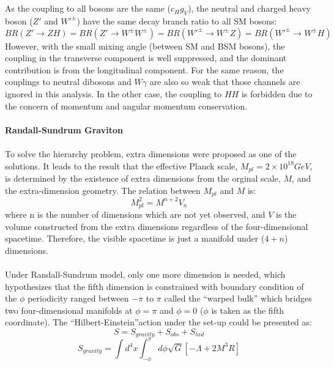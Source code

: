 \\
\\As the coupling to all bosons are the same ($c_{H}g_{V}$), the neutral and charged heavy boson ($Z'$ and $W'^{\pm}$) have the same decay branch ratio to all SM bosons:
\begin{equation}
BR(Z'\rightarrow ZH) = BR(Z'\rightarrow W^\pm W^\pm) = BR(W'^\pm \rightarrow W^\pm Z) = BR(W'^\pm \rightarrow W^\pm H)
\end{equation}
However, with the small mixing angle (between SM and BSM bosons), the coupling in the transverse component is well suppressed, and the dominant contribution is from the longitudinal component. For the same reason, the couplings to neutral dibosons and $W\gamma$ are also so weak that those channels are ignored in this analysis. In the other case, the coupling to $HH$ is forbidden due to the concern of momentum and angular momentum conservation. 
\\
\\{\bf Randall-Sundrum Graviton}
\\
\\To solve the hierarchy problem, extra dimensions were proposed as one of the solutions\cite{Randall:1999ee}. It leads to the result that the effective Planck scale, $M_{pl}=2\times10^{18}GeV$, is determined by the existence of extra dimensions from the orginal scale, $M$, and the extra-dimension geometry. The relation between $M_{pl}$ and $M$ is: 
\begin{equation}
\label{Eq:planck_relation}
M_{pl}^{2} = M^{n+2}V_{n}
\end{equation}
where n is the number of dimensions which are not yet observed, and $V$ is the volume constructed from the extra dimensions regardless of the four-dimensional spacetime. Therefore, the visible spacetime is just a manifold under ($4+n$) dimensions.
\\ 
\\Under Randall-Sundrum model, only one more dimension is needed, which hypothesizes that the fifth dimension is constrained with boundary condition of the $\phi$ periodicity ranged between $-\pi$ to $\pi$ called the ``warped bulk'' which bridges two four-dimensional manifolds at $\phi=\pi$  and $\phi=0$ ($\phi$ is taken as the fifth coordinate). The ``Hilbert-Einstein''action under the set-up could be presented as:
\begin{equation}
S = S_{gravity} +S_{obs} + S_{hid}
\end{equation}
\begin{equation}
S_{gravity} = \int d^4x \int^{\pi}_{-\phi}d\phi\sqrt{G}\left[-\Lambda +2M^3R\right]
\end{equation}
